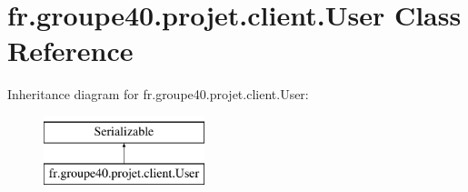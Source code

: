 \hypertarget{classfr_1_1groupe40_1_1projet_1_1client_1_1_user}{}\section{fr.\+groupe40.\+projet.\+client.\+User Class Reference}
\label{classfr_1_1groupe40_1_1projet_1_1client_1_1_user}
Inheritance diagram for fr.\+groupe40.\+projet.\+client.\+User\+:\begin{figure}[H]
\begin{center}
\leavevmode
\includegraphics[height=2.000000cm]{classfr_1_1groupe40_1_1projet_1_1client_1_1_user}
\end{center}
\end{figure}
